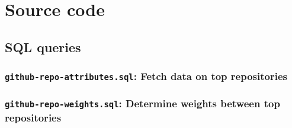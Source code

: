 \documentclass[twocolumn]{article}
\begin{document}



\onecolumn
\appendix
\section{Source code}
\subsection{SQL queries}
\label{app:sql}

\subsubsection{\texttt{github-repo-attributes.sql}: Fetch data on top
repositories}


\subsubsection{\texttt{github-repo-weights.sql}: Determine weights between top
repositories}

\end{document}
